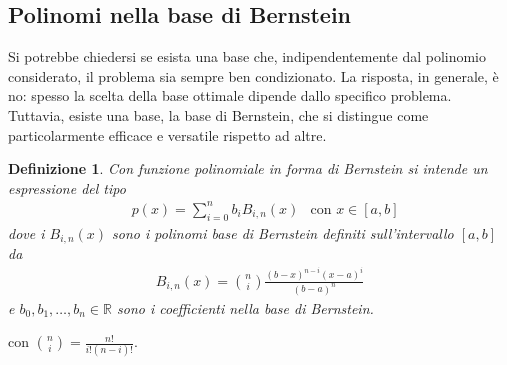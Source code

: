 \documentclass{article}
\newtheorem*{definition}{\color{red}\textbf{Definizione}}
\numberwithin{equation}{section}
\begin{document}
\subsection{Polinomi nella base di Bernstein}
Si potrebbe chiedersi se esista una base che, indipendentemente dal polinomio
considerato, il problema sia sempre ben condizionato. La risposta, in
generale, è no: spesso la scelta della base ottimale dipende dallo
specifico problema. Tuttavia, esiste una base, la base di Bernstein, che si
distingue come particolarmente efficace e versatile rispetto ad altre.
\begin{definition}
    Con funzione polinomiale in forma di Bernstein si intende un espressione del
    tipo 
    \begin{equation*}
        \begin{aligned}
       & p(x)=\displaystyle\sum_{i=0}^{n}b_iB_{i,n}(x) & \text{con }x\in[a,b]
        \end{aligned} 
    \end{equation*}
    dove i $B_{i,n}(x)$ sono i polinomi base di Bernstein definiti sull'intervallo
    $[a,b]$ da 
    \begin{equation} \label{eq:bernstein}
        \begin{aligned}
            B_{i,n}(x)=\binom{n}{i}\frac{(b-x)^{n-i}(x-a)^i}{(b-a)^n}
        \end{aligned} 
    \end{equation}
    e $b_0,b_1,\ldots,b_n\in \mathbb{R}$ sono i coefficienti nella base di
    Bernstein.
\end{definition}
con $\binom{n}{i}=\frac{n!}{i!(n-i)!}$.
\end{document}
